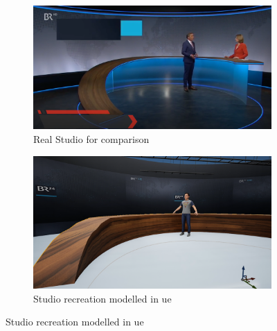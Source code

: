 \documentclass[
  a4paper,  %
  twoside,  %
  bibliography=totoc,
  headsepline,
  cleardoublepage=empty,
  parskip=half,
  draft=false
]{scrbook}
\begin{document}
\begin{figure}[h]
  \centering
  \begin{subfigure}{0.45\textwidth}
    \includegraphics[width=\linewidth]{graphics/images/unreal-engine/studio/Studio-real.png}
    \caption{Real Studio for comparison}
  \end{subfigure}
  \begin{subfigure}{0.45\textwidth}
    \includegraphics[width=\linewidth]{graphics/images/unreal-engine/studio/Studio-Comparison.png}
    \caption{Studio recreation modelled in \gls{ue}}
  \end{subfigure}


\end{figure}
\end{document}
